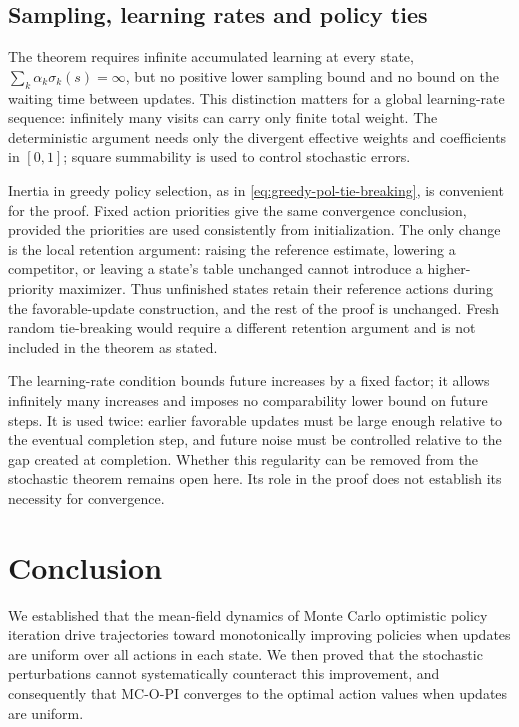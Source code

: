 \subsection{Sampling, learning rates and policy ties}
\label{sec: relaxing conditions}
The theorem requires infinite accumulated learning at every state, $\sum_k\alpha_k\sigma_k(s)=\infty$, but no positive lower sampling bound and no bound on the waiting time between updates. This distinction matters for a global learning-rate sequence: infinitely many visits can carry only finite total weight. The deterministic argument needs only the divergent effective weights and coefficients in $[0,1]$; square summability is used to control stochastic errors.

Inertia in greedy policy selection, as in \eqref{eq:greedy-pol-tie-breaking}, is convenient for the proof. Fixed action priorities give the same convergence conclusion, provided the priorities are used consistently from initialization. The only change is the local retention argument: raising the reference estimate, lowering a competitor, or leaving a state's table unchanged cannot introduce a higher-priority maximizer. Thus unfinished states retain their reference actions during the favorable-update construction, and the rest of the proof is unchanged. Fresh random tie-breaking would require a different retention argument and is not included in the theorem as stated.

The learning-rate condition bounds future increases by a fixed factor; it allows infinitely many increases and imposes no comparability lower bound on future steps. It is used twice: earlier favorable updates must be large enough relative to the eventual completion step, and future noise must be controlled relative to the gap created at completion. Whether this regularity can be removed from the stochastic theorem remains open here. Its role in the proof does not establish its necessity for convergence.

\section{Conclusion}






We established that the mean-field dynamics of Monte Carlo optimistic policy iteration drive trajectories toward monotonically improving policies when updates are uniform over all actions in each state.
We then proved that the stochastic perturbations cannot systematically counteract this improvement,
and consequently that MC-O-PI converges to the optimal action values when updates are uniform.



